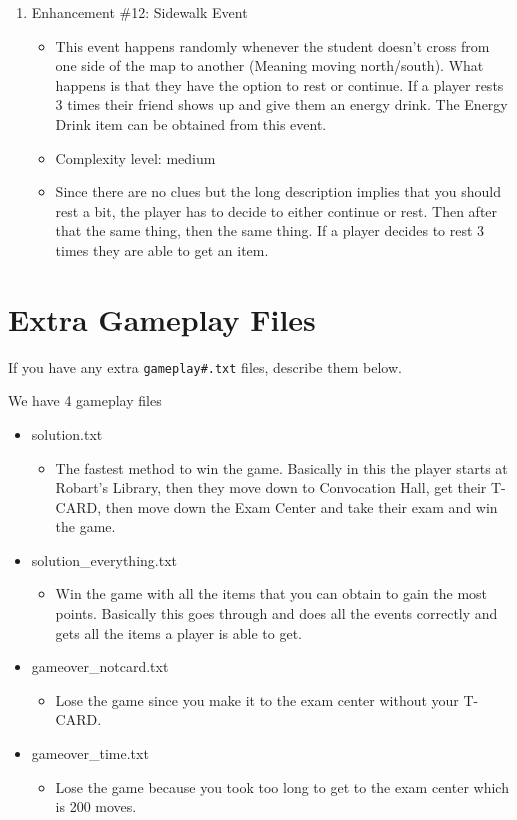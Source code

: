 \documentclass[11pt]{article}
\begin{document}
\begin{enumerate}
 \item Enhancement \#12: Sidewalk Event
	\begin{itemize}
	\item This event happens randomly whenever the student doesn't cross from one side of the map to another (Meaning moving north/south). What happens is that they have the option to rest or continue. If a player rests 3 times their friend shows up and give them an energy drink. The Energy Drink item can be obtained from this event.
	\item Complexity level: medium
	\item Since there are no clues but the long description implies that you should rest a bit, the player has to decide to either continue or rest. Then after that the same thing, then the same thing. If a player decides to rest 3 times they are able to get an item.
	\end{itemize}


\end{enumerate}


\section*{Extra Gameplay Files}

If you have any extra \texttt{gameplay\#.txt} files, describe them below.

We have 4 gameplay files
\begin{itemize}
\item solution.txt
    \begin{itemize}
    \item The fastest method to win the game. Basically in this the player starts at Robart's Library, then they move down to Convocation Hall, get their T-CARD, then move down the Exam Center and take their exam and win the game.
    \end{itemize}
\item solution\_everything.txt
    \begin{itemize}
        \item Win the game with all the items that you can obtain to gain the most points. Basically this goes through and does all the events correctly and gets all the items a player is able to get.
    \end{itemize}
\item gameover\_notcard.txt
    \begin{itemize}
        \item Lose the game since you make it to the exam center without your T-CARD.
    \end{itemize}
\item gameover\_time.txt
    \begin{itemize}
        \item Lose the game because you took too long to get to the exam center which is 200 moves.
    \end{itemize}
\end{itemize}
\end{document}
